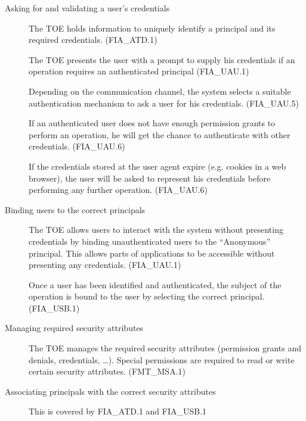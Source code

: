 \documentclass[12pt,english]{scrbook}
\begin{document}
    \begin{description}
        \item[Asking for and validating a user's credentials]

            The TOE holds information to uniquely identify a principal and its
            required credentials. (FIA\_ATD.1) 
            
            The TOE presents the user with a prompt to supply his credentials
            if an operation requires an authenticated principal (FIA\_UAU.1)

            Depending on the communication channel, the system selects a
            suitable authentication mechanism to ask a user for his
            credentials. (FIA\_UAU.5)

            If an authenticated user does not have enough permission grants to
            perform an operation, he will get the chance to authenticate with
            other credentials. (FIA\_UAU.6)

            If the credentials stored at the user agent expire (e.g. cookies in
            a web browser), the user will be asked to represent his credentials
            before performing any further operation. (FIA\_UAU.6)

        \item[Binding users to the correct principals]

            The TOE allows users to interact with the system without presenting
            credentials by binding unauthenticated users to the ``Anonymous''
            principal. This allows parts of applications to be accessible without
            presenting any credentials. (FIA\_UAU.1)

            Once a user has been identified and authenticated, the subject of
            the operation is bound to the user by selecting the correct
            principal. (FIA\_USB.1)

        \item[Managing required security attributes]

            The TOE manages the required security attributes (permission grants
            and denials, credentials, \dots). Special permissions are required
            to read or write certain security attributes. (FMT\_MSA.1)

        \item[Associating principals with the correct security attributes]

            This is covered by FIA\_ATD.1 and FIA\_USB.1

    \end{description}
\end{document}
